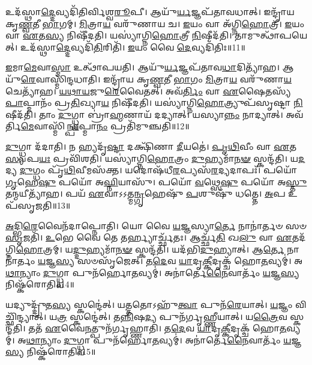 𑌉𑌦᳴𑌸𑍍𑌥𑌾\-\ul{𑌦𑍍𑌦𑍇}\-𑌵𑍍𑌯𑌦𑌿᳴𑌤𑌿𑌰𑍍𑌵𑌿𑌶𑍍𑌵\-\ul{𑌰𑍂}\-𑌪𑍀।
𑌆𑌯𑍁᳴\-\ul{𑌰𑍍𑌯}\-𑌜𑍍𑌞𑌪᳴𑌤𑌾𑌵𑌧𑌾𑌤𑍍।
𑌇𑌨𑍍𑌦𑍍𑌰𑌾᳴𑌯 𑌕𑍃\-\ul{𑌣𑍍𑌵}\-𑌤𑍀 \ul{𑌭𑌾}\-𑌗𑌮𑍍।
\-\ul{𑌮𑌿}\-𑌤𑍍𑌰𑌾\-\ul{𑌯} 𑌵𑌰𑍁᳴𑌣𑌾𑌯 𑌚।
\-\ul{𑌇}\-𑌯𑌂 𑌵𑌾 𑌅᳴𑌗𑍍𑌨𑌿\-\ul{𑌹𑍋}\-𑌤𑍍𑌰𑍀।
\-\ul{𑌇}\-𑌯𑌂 𑌵𑌾 \ul{𑌏}\-𑌤\-\ul{𑌸𑍍𑌯} 𑌨𑌿𑌷𑍀᳴𑌦𑌤𑌿।
𑌯𑌸𑍍𑌯𑌾॑𑌗𑍍𑌨𑌿\-\ul{𑌹𑍋}\-𑌤𑍍𑌰𑍀 \ul{𑌨𑌿}\-𑌷𑍀𑌦᳴𑌤𑌿।
𑌤𑌾𑌮𑍁𑌤𑍍𑌥𑌾᳴𑌪𑌯𑍇𑌤𑍍।
𑌉𑌦᳴𑌸𑍍𑌥𑌾\-\ul{𑌦𑍍𑌦𑍇}\-𑌵𑍍𑌯𑌦𑌿᳴\-\ul{𑌤𑌿}\-𑌰𑌿𑌤𑌿᳴।
\-\ul{𑌇}\-𑌯𑌂 𑌵𑍈 \ul{𑌦𑍇}\-𑌵𑍍𑌯𑌦𑌿᳴𑌤𑌿𑌃॥11॥

\-\ul{𑌇}\-𑌮𑌾\-\ul{𑌮𑍇}\-𑌵𑌾\-\ul{𑌸𑍍𑌮𑌾} 𑌉𑌤𑍍𑌥𑌾᳴𑌪𑌯𑌤𑌿।
𑌆𑌯𑍁᳴\-\ul{𑌰𑍍𑌯}\-𑌜𑍍𑌞𑌪᳴𑌤𑌾𑌵\-\ul{𑌧𑌾}\-𑌦𑌿𑌤𑍍𑌯𑌾᳴𑌹।
𑌆𑌯𑍁᳴\-\ul{𑌰𑍇}\-𑌵𑌾𑌸𑍍𑌮𑌿᳴𑌨𑍍𑌦𑌧𑌾𑌤𑌿।
𑌇𑌨𑍍𑌦𑍍𑌰𑌾᳴𑌯 𑌕𑍃\-\ul{𑌣𑍍𑌵}\-𑌤𑍀 \ul{𑌭𑌾}\-𑌗𑌂 \ul{𑌮𑌿}\-𑌤𑍍𑌰𑌾\-\ul{𑌯} 𑌵𑌰𑍁᳴𑌣𑌾\-\ul{𑌯} 𑌚𑍇𑌤𑍍𑌯𑌾᳴𑌹।
\-\ul{𑌯}\-\-\ul{𑌥𑌾}\-\-\ul{𑌯}\-𑌜𑍁\-\ul{𑌰𑍇}\-𑌵𑍈𑌤𑌤𑍍।
𑌅𑌵᳴\-\ul{𑌰𑍍𑌤𑌿𑌂} 𑌵𑌾 \ul{𑌏}\-𑌷𑍈𑌤𑌸𑍍𑌯᳴ \ul{𑌪𑌾}\-𑌪𑍍𑌮𑌾𑌨𑌂᳴ 𑌪𑍍𑌰\-\ul{𑌤𑌿}\-𑌖𑍍𑌯𑌾\-\ul{𑌯} 𑌨𑌿𑌷𑍀᳴𑌦𑌤𑌿।
𑌯𑌸𑍍𑌯𑌾॑𑌗𑍍𑌨𑌿\-\ul{𑌹𑍋}\-𑌤𑍍𑌰𑍍𑌯𑍁𑌪᳴𑌸𑍃𑌷𑍍𑌟𑌾 \ul{𑌨𑌿}\-𑌷𑍀𑌦᳴𑌤𑌿।
𑌤𑌾𑌂 \ul{𑌦𑍁}\-𑌗𑍍𑌧𑍍𑌵𑌾 𑌬𑍍𑌰𑌾॑\-\ul{𑌹𑍍𑌮}\-𑌣𑌾𑌯᳴ 𑌦𑌦𑍍𑌯𑌾𑌤𑍍।
𑌯𑌸𑍍𑌯𑌾\-\ul{𑌨𑍍𑌨𑌂} 𑌨𑌾𑌦𑍍𑌯𑌾𑌤𑍍।
𑌅𑌵᳴𑌰𑍍𑌤𑌿\-\ul{𑌮𑍇}\-𑌵𑌾𑌸𑍍𑌮𑌿᳴\-\ul{𑌨𑍍𑌪𑌾}\-𑌪𑍍𑌮𑌾\-\ul{𑌨𑌂} 𑌪𑍍𑌰𑌤𑌿᳴\-𑌮𑍁𑌞𑍍𑌚𑌤𑌿॥12॥

\-\ul{𑌦𑍁}\-𑌗𑍍𑌧𑍍𑌵𑌾 𑌦᳴𑌦𑌾𑌤𑌿।
𑌨 𑌹𑍍𑌯𑌦𑍃᳴\-\ul{𑌷𑍍𑌟𑌾} 𑌦𑌕𑍍𑌷𑌿᳴𑌣𑌾 \ul{𑌦𑍀}\-𑌯𑌤𑍇॑।
\-\ul{𑌪𑍃}\-\-\ul{𑌥𑌿}\-𑌵𑍀𑌂 𑌵𑌾 \ul{𑌏}\-𑌤\-\ul{𑌸𑍍𑌯} 𑌪\-\ul{𑌯𑌃} 𑌪𑍍𑌰𑌵𑌿᳴𑌶𑌤𑌿।
𑌯𑌸𑍍𑌯𑌾॑𑌗𑍍𑌨𑌿\-\ul{𑌹𑍋}\-𑌤𑍍𑌰𑌂 \ul{𑌦𑍁}\-𑌹𑍍𑌯𑌮𑌾᳴\-\ul{𑌨}\-\-\ul{𑍟} 𑌸𑍍𑌕𑌨𑍍𑌦᳴𑌤𑌿।
𑌯\-\ul{𑌦}\-𑌦𑍍𑌯 \ul{𑌦𑍁}\-𑌗𑍍𑌧𑌂 𑌪𑍃᳴\-\ul{𑌥𑌿}\-𑌵𑍀𑌮𑌸᳴𑌕𑍍𑌤।
𑌯𑌦𑍋𑌷᳴𑌧𑍀\-\ul{𑌰}\-𑌪𑍍𑌯𑌸᳴\-\ul{𑌰}\-𑌦𑍍𑌯𑌦𑌾𑌪𑌃᳴।
𑌪𑌯𑍋᳴ \ul{𑌗𑍃}\-𑌹𑍇\-\ul{𑌷𑍁} 𑌪𑌯𑍋᳴ 𑌅\-\ul{𑌘𑍍𑌨𑌿}\-𑌯𑌾𑌸𑍁᳴।
𑌪𑌯𑍋᳴ \ul{𑌵}\-𑌥𑍍𑌸𑍇\-\ul{𑌷𑍁} 𑌪𑌯𑍋᳴ 𑌅\-\ul{𑌸𑍍𑌤𑍁} 𑌤𑌨𑍍𑌮𑌯𑍀𑌤𑍍𑌯𑌾᳴𑌹।
𑌪𑌯᳴ \ul{𑌏}\-𑌵𑌾𑌽𑌽𑌤𑍍𑌮\-\ul{𑌨𑍍𑌗𑍃}\-𑌹𑍇𑌷𑍁᳴ \ul{𑌪}\-𑌶𑍁𑌷𑍁᳴ 𑌧𑌤𑍍𑌤𑍇।
\-\ul{𑌅}\-𑌪 𑌉𑌪᳴\-𑌸𑍃𑌜𑌤𑌿॥13॥

\-\ul{𑌅}\-𑌦𑍍𑌭𑌿\-\ul{𑌰𑍇}\-𑌵𑍈𑌨᳴𑌦𑌾𑌪𑍍𑌨𑍋𑌤𑌿।
𑌯𑍋 𑌵𑍈 \ul{𑌯}\-𑌜𑍍𑌞𑌸𑍍𑌯𑌾\-\ul{𑌰𑍍𑌤𑍇} 𑌨𑌾𑌨𑌾॑𑌰𑍍𑌤𑍞 𑌸𑍞\-\ul{𑌸𑍃}\-𑌜𑌤𑌿᳴।
\-\ul{𑌉}\-𑌭𑍇 𑌵𑍈 𑌤𑍇 𑌤𑌰𑍍𑌹𑍍𑌯𑌾𑌰𑍍𑌚𑍍𑌛᳴𑌤𑌃।
𑌆𑌰𑍍𑌚𑍍𑌛᳴\-\ul{𑌤𑌿} 𑌖\-\ul{𑌲𑍁} 𑌵𑌾 \ul{𑌏}\-𑌤𑌦᳴𑌗𑍍𑌨𑌿\-\ul{𑌹𑍋}\-𑌤𑍍𑌰𑌮𑍍।
𑌯\-\ul{𑌦𑍍𑌦𑍁}\-𑌹𑍍𑌯𑌮𑌾᳴\-\ul{𑌨}\-\-\ul{𑍟} 𑌸𑍍𑌕𑌨𑍍𑌦᳴𑌤𑌿।
𑌯𑌦᳴𑌭𑌿\-\ul{𑌦𑍁}\-𑌹𑍍𑌯𑌾𑌤𑍍।
𑌆\-\ul{𑌰𑍍𑌤𑍇} 𑌨𑌾𑌨𑌾॑𑌰𑍍𑌤𑌂 \ul{𑌯}\-𑌜𑍍𑌞\-\ul{𑌸𑍍𑌯} 𑌸𑍞𑌸𑍃᳴𑌜𑍇𑌤𑍍।
𑌤\-\ul{𑌦𑍇}\-𑌵 \ul{𑌯𑌾}\-𑌦𑍃\-\ul{𑌕𑍍𑌕𑍀}\-𑌦𑍃𑌕𑍍𑌚᳴ 𑌹𑍋\-\ul{𑌤}\-𑌵𑍍𑌯𑌮𑍍॑।
𑌅\-\ul{𑌥𑌾}\-𑌨𑍍𑌯𑌾𑌂 \ul{𑌦𑍁}\-𑌗𑍍𑌧𑍍𑌵𑌾 𑌪𑍁𑌨᳴𑌰𑍍\mbox{}𑌹𑍋\-\ul{𑌤}\-𑌵𑍍𑌯𑌮𑍍॑।
𑌅𑌨𑌾॑𑌰𑍍𑌤𑍇\-\ul{𑌨𑍈}\-𑌵𑌾𑌰𑍍𑌤𑌂᳴ \ul{𑌯}\-𑌜𑍍𑌞\-\ul{𑌸𑍍𑌯} 𑌨𑌿𑌷𑍍𑌕᳴𑌰𑍋𑌤𑌿॥14॥

𑌯𑌦𑍍𑌯𑍁𑌦𑍍𑌦𑍍𑌰𑍁᳴𑌤\-\ul{𑌸𑍍𑌯} 𑌸𑍍𑌕𑌨𑍍𑌦𑍇॑𑌤𑍍।
𑌯𑌤𑍍𑌤𑌤𑍋\-𑌽𑌹𑍁᳴\-\ul{𑌤𑍍𑌵𑌾} 𑌪𑍁𑌨᳴\-\ul{𑌰𑍇}\-𑌯𑌾𑌤𑍍।
\-\ul{𑌯}\-𑌜𑍍𑌞𑌂 𑌵𑌿𑌚𑍍𑌛𑌿᳴𑌨𑍍𑌦𑍍𑌯𑌾𑌤𑍍।
𑌯\-\ul{𑌤𑍍𑌰} 𑌸𑍍𑌕𑌨𑍍𑌦𑍇॑𑌤𑍍।
𑌤\-\ul{𑌨𑍍𑌨𑌿}\-𑌷\-\ul{𑌦𑍍𑌯} 𑌪𑍁𑌨᳴𑌰𑍍𑌗𑍃𑌹𑍍𑌣𑍀𑌯𑌾𑌤𑍍।
𑌯\-\ul{𑌤𑍍𑌰𑍈}\-𑌵 𑌸𑍍𑌕𑌨𑍍𑌦᳴𑌤𑌿।
𑌤𑌤᳴ \ul{𑌏}\-𑌵𑍈\-\ul{𑌨}\-𑌤𑍍𑌪𑍁𑌨᳴𑌰𑍍𑌗𑍃𑌹𑍍𑌣𑌾𑌤𑌿।
𑌤\-\ul{𑌦𑍇}\-𑌵 \ul{𑌯𑌾}\-𑌦𑍃\-\ul{𑌕𑍍𑌕𑍀}\-𑌦𑍃𑌕𑍍𑌚᳴ 𑌹𑍋\-\ul{𑌤}\-𑌵𑍍𑌯𑌮𑍍॑।
𑌅\-\ul{𑌥𑌾}\-𑌨𑍍𑌯𑌾𑌂 \ul{𑌦𑍁}\-𑌗𑍍𑌧𑍍𑌵𑌾 𑌪𑍁𑌨᳴𑌰𑍍\mbox{}𑌹𑍋\-\ul{𑌤}\-𑌵𑍍𑌯𑌮𑍍॑।
𑌅𑌨𑌾॑𑌰𑍍𑌤𑍇\-\ul{𑌨𑍈}\-𑌵𑌾𑌰𑍍𑌤𑌂᳴ \ul{𑌯}\-𑌜𑍍𑌞\-\ul{𑌸𑍍𑌯} 𑌨𑌿𑌷𑍍𑌕᳴𑌰𑍋𑌤𑌿॥15॥

